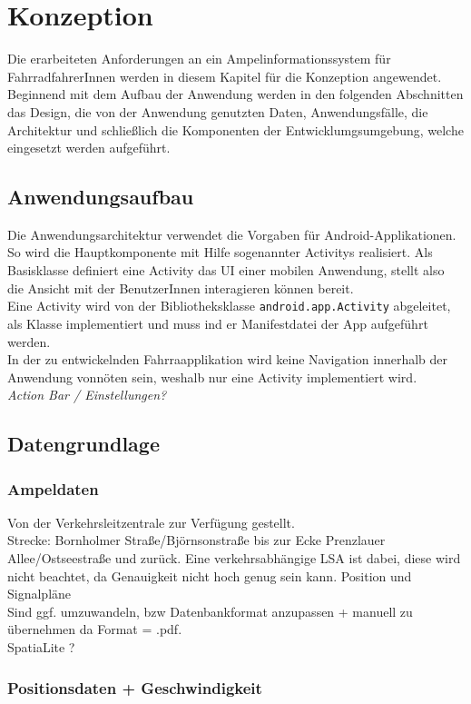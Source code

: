 \chapter{\label{chap:entwurf}Konzeption}
Die erarbeiteten Anforderungen an ein Ampelinformationssystem für FahrradfahrerInnen werden in diesem Kapitel für die Konzeption angewendet. Beginnend mit dem Aufbau der Anwendung werden in den folgenden Abschnitten das Design, die von der Anwendung genutzten Daten, Anwendungsfälle, die Architektur und schließlich die Komponenten der Entwicklumgsumgebung, welche eingesetzt werden aufgeführt. 
\section{Anwendungsaufbau}
Die Anwendungsarchitektur verwendet die Vorgaben für Android-Applikationen. So wird die Hauptkomponente mit Hilfe sogenannter \glspl{Activity} realisiert. Als Basisklasse definiert eine \gls{Activity} das \gls{UI} einer mobilen Anwendung, stellt also die Ansicht mit der BenutzerInnen interagieren können bereit.\\
Eine \gls{Activity} wird von der Bibliotheksklasse \texttt{android.app.Activity} abgeleitet, als Klasse implementiert und muss ind er Manifestdatei der \gls{App} aufgeführt werden. \cite{android_activity} \\
In der zu entwickelnden Fahrraapplikation wird keine Navigation innerhalb der Anwendung vonnöten sein, weshalb nur eine \gls{Activity} implementiert wird.\\
\textit{Action Bar / Einstellungen?}
\section{Datengrundlage}
\subsection{Ampeldaten}
Von der Verkehrsleitzentrale zur Verfügung gestellt.\\
Strecke: Bornholmer Straße/Björnsonstraße bis zur Ecke Prenzlauer Allee/Ostseestraße und zurück. 
Eine verkehrsabhängige \gls{LSA} ist dabei, diese wird nicht beachtet, da Genauigkeit nicht hoch genug sein kann.
Position und Signalpläne\\
Sind ggf. umzuwandeln, bzw Datenbankformat anzupassen + manuell zu übernehmen da Format = .pdf.\\
SpatiaLite ?
\subsection{Positionsdaten + Geschwindigkeit}
